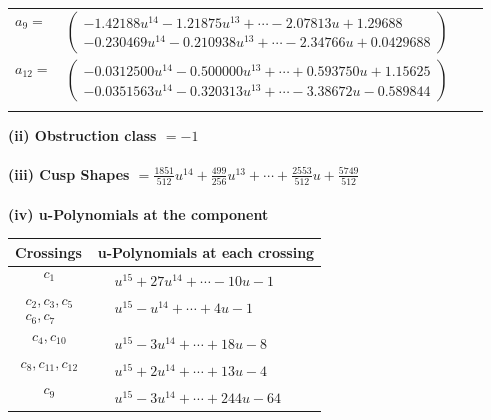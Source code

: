 \documentclass[1p]{elsarticle_modified}
\theoremstyle{definition}
\begin{document}
\begin{tabular}{m{7pt} m{180pt} m{7pt} m{180pt} }
\flushright $a_{9}=$&$\begin{pmatrix}-1.42188 u^{14}-1.21875 u^{13}+\cdots-2.07813 u+1.29688\\-0.230469 u^{14}-0.210938 u^{13}+\cdots-2.34766 u+0.0429688\end{pmatrix}$ \\
\flushright $a_{12}=$&$\begin{pmatrix}-0.0312500 u^{14}-0.500000 u^{13}+\cdots+0.593750 u+1.15625\\-0.0351563 u^{14}-0.320313 u^{13}+\cdots-3.38672 u-0.589844\end{pmatrix}$\\&\end{tabular}
\flushleft \textbf{(ii) Obstruction class $= -1$}\\~\\
\flushleft \textbf{(iii) Cusp Shapes $= \frac{1851}{512} u^{14}+\frac{499}{256} u^{13}+\cdots+\frac{2553}{512} u+\frac{5749}{512}$}\\~\\
\newpage\renewcommand{\arraystretch}{1}
\flushleft \textbf{(iv) u-Polynomials at the component}\newline \\
\begin{tabular}{m{50pt}|m{274pt}}
Crossings & \hspace{64pt}u-Polynomials at each crossing \\
\hline $$\begin{aligned}c_{1}\end{aligned}$$&$\begin{aligned}
&u^{15}+27 u^{14}+\cdots-10 u-1
\end{aligned}$\\
\hline $$\begin{aligned}c_{2},c_{3},c_{5}\\c_{6},c_{7}\end{aligned}$$&$\begin{aligned}
&u^{15}- u^{14}+\cdots+4 u-1
\end{aligned}$\\
\hline $$\begin{aligned}c_{4},c_{10}\end{aligned}$$&$\begin{aligned}
&u^{15}-3 u^{14}+\cdots+18 u-8
\end{aligned}$\\
\hline $$\begin{aligned}c_{8},c_{11},c_{12}\end{aligned}$$&$\begin{aligned}
&u^{15}+2 u^{14}+\cdots+13 u-4
\end{aligned}$\\
\hline $$\begin{aligned}c_{9}\end{aligned}$$&$\begin{aligned}
&u^{15}-3 u^{14}+\cdots+244 u-64
\end{aligned}$\\
\hline
\end{tabular}\\~\\
\end{document}
